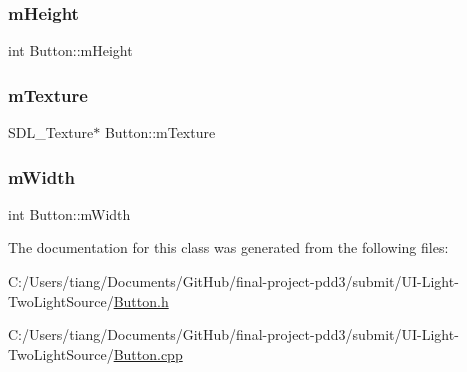\subsubsection{\texorpdfstring{m\+Height}{mHeight}}
{\footnotesize\ttfamily int Button\+::m\+Height\hspace{0.3cm}{\ttfamily [private]}}

\mbox{\label{class_button_ac5e57d9ffee5d8bae504d008562c1951}} 
\subsubsection{\texorpdfstring{m\+Texture}{mTexture}}
{\footnotesize\ttfamily S\+D\+L\+\_\+\+Texture$\ast$ Button\+::m\+Texture\hspace{0.3cm}{\ttfamily [private]}}

\mbox{\label{class_button_a64b130b0efe8346077d12856bd2b1a93}} 
\subsubsection{\texorpdfstring{m\+Width}{mWidth}}
{\footnotesize\ttfamily int Button\+::m\+Width\hspace{0.3cm}{\ttfamily [private]}}



The documentation for this class was generated from the following files\+:\begin{DoxyCompactItemize}
\item 
C\+:/\+Users/tiang/\+Documents/\+Git\+Hub/final-\/project-\/pdd3/submit/\+U\+I-\/\+Light-\/\+Two\+Light\+Source/\mbox{\hyperlink{_button_8h}{Button.\+h}}\item 
C\+:/\+Users/tiang/\+Documents/\+Git\+Hub/final-\/project-\/pdd3/submit/\+U\+I-\/\+Light-\/\+Two\+Light\+Source/\mbox{\hyperlink{_button_8cpp}{Button.\+cpp}}\end{DoxyCompactItemize}
